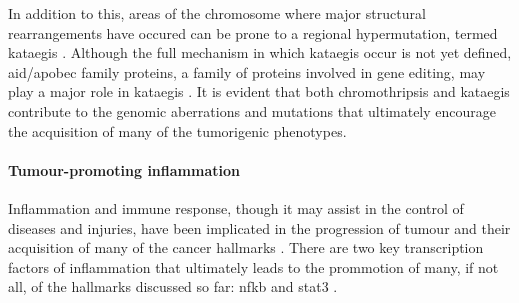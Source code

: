 In addition to this, areas of the chromosome where major structural rearrangements have occured can be prone to a regional hypermutation, termed \gls{kataegis} \citep{Leibowitz2015,Nik-Zainal2012}.
Although the full mechanism in which \gls{kataegis} occur is not yet defined, \gls{aid}/\acrshort{apobec} family proteins, a family of proteins involved in gene editing, may play a major role in \gls{kataegis} \citep{Leibowitz2015,Nik-Zainal2012}.
It is evident that both \gls{chromothripsis} and \gls{kataegis} contribute to the genomic aberrations and mutations that ultimately encourage the acquisition of many of the tumorigenic phenotypes.

\paragraph{Tumour-promoting inflammation}

\noindent
Inflammation and immune response, though it may assist in the control of diseases and injuries, have been implicated in the progression of tumour and their acquisition of many of the cancer hallmarks \citep{Hanahan2011}.
There are two key transcription factors of inflammation that ultimately leads to the prommotion  of many, if not all, of the hallmarks discussed so far: \gls{nfkb} and \gls{stat3} \citep{Mantovani2008}.

